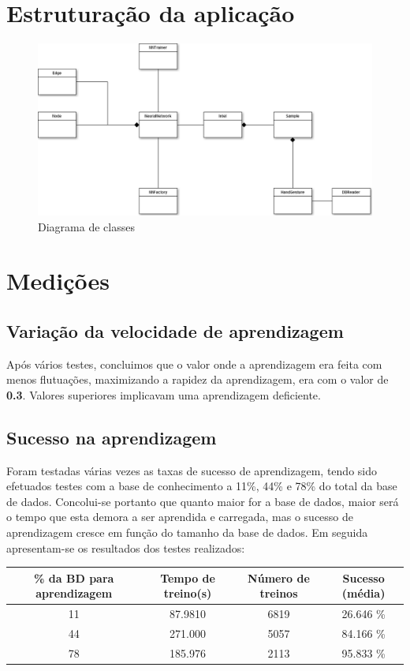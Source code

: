 \documentclass[10pt,a4paper]{article}
\begin{document}
\section{Estruturação da aplicação}
\begin{figure}[here]
\centering
\includegraphics[scale=0.33]{iart_nn.png}
\caption{Diagrama de classes}
\end{figure}

\section{Medições}

\subsection{Variação da velocidade de aprendizagem}

Após vários testes, concluimos que o valor onde a aprendizagem era feita com menos flutuações, maximizando a rapidez da aprendizagem, era com o valor de \textbf{0.3}. Valores superiores implicavam uma aprendizagem deficiente.

\subsection{Sucesso na aprendizagem}

Foram testadas várias vezes as taxas de sucesso de aprendizagem, tendo sido efetuados testes com a base de conhecimento a 11\%, 44\% e 78\% do total da base de dados. Concolui-se portanto que quanto maior for a base de dados, maior será o tempo que esta demora a ser aprendida e carregada, mas o sucesso de aprendizagem cresce em função do tamanho da base de dados. Em seguida apresentam-se os resultados dos testes realizados:

\begin{tabular}{|c|c|c|c|}
\hline 
\% da BD para aprendizagem & Tempo de treino(s)& Número de treinos & Sucesso (média)\\ 
\hline 
11 & 87.9810 & 6819 & 26.646 \% \\ 
44 & 271.000 & 5057 & 84.166 \% \\ 
78 & 185.976 & 2113 & 95.833 \% \\ 
\hline
\end{tabular} 
\end{document}
